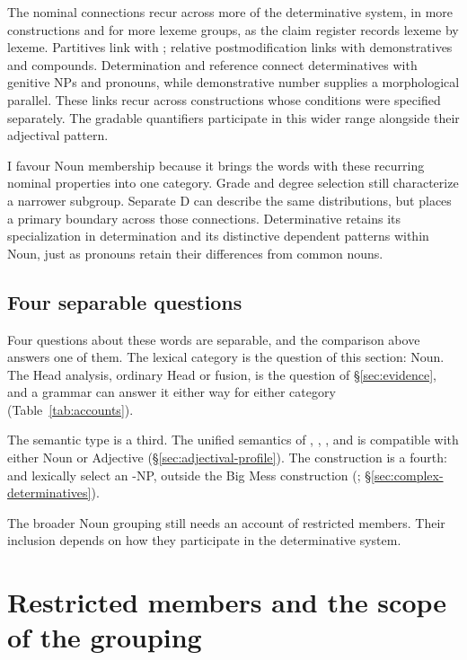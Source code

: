 \documentclass[12pt]{article}
\begin{document}
The nominal connections recur across more of the determinative system, in more constructions and for more lexeme groups, as the claim register records lexeme by lexeme. Partitives link  with ; relative postmodification links  with demonstratives and compounds. Determination and reference connect determinatives with genitive NPs and pronouns, while demonstrative number supplies a morphological parallel. These links recur across constructions whose conditions were specified separately. The gradable quantifiers participate in this wider range alongside their adjectival pattern.

I favour Noun membership because it brings the words with these recurring nominal properties into one category. Grade and degree selection still characterize a narrower subgroup. Separate D can describe the same distributions, but places a primary boundary across those connections. Determinative retains its specialization in determination and its distinctive dependent patterns within Noun, just as pronouns retain their differences from common nouns.

\subsection{Four separable questions}\label{sec:four-questions}

Four questions about these words are separable, and the comparison above answers one of them. The lexical category is the question of this section: Noun. The Head analysis, ordinary Head or fusion, is the question of §\ref{sec:evidence}, and a grammar can answer it either way for either category (Table~\ref{tab:accounts}).

The semantic type is a third. The unified semantics of , , , and  is compatible with either Noun or Adjective (§\ref{sec:adjectival-profile}). The construction is a fourth:  and  lexically select an -NP, outside the Big Mess construction (; §\ref{sec:complex-determinatives}).

The broader Noun grouping still needs an account of restricted members. Their inclusion depends on how they participate in the determinative system.

\section{Restricted members and the scope of the grouping}\label{sec:articles}
\end{document}
